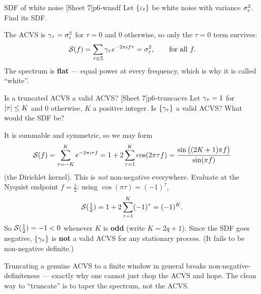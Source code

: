 \begin{exercise}{SDF of white noise \quad\textnormal{[Sheet 7]}}{p6-wnsdf}
Let $\{\varepsilon_t\}$ be white noise with variance $\sigma_\varepsilon^2$. Find its SDF.
\end{exercise}
\begin{solution}
The ACVS is $\gamma_\tau=\sigma_\varepsilon^2$ for $\tau=0$ and $0$ otherwise, so only
the $\tau=0$ term survives:
\[
\mathcal{S}(f)=\sum_{\tau\in\mathbb{Z}}\gamma_\tau e^{-2\pi i f\tau}=\sigma_\varepsilon^2,
\qquad\text{for all }f .
\]
The spectrum is \textbf{flat} --- equal power at every frequency, which is why
it is called ``white''.
\end{solution}

\begin{exercise}{Is a truncated ACVS a valid ACVS? \quad\textnormal{[Sheet 7]}}{p6-truncacvs}
Let $\gamma_\tau=1$ for $\left\lvert \tau \right\rvert\le K$ and $0$ otherwise, $K$ a positive
integer. Is $\{\gamma_\tau\}$ a valid ACVS? What would the SDF be?
\end{exercise}
\begin{solution}
It is summable and symmetric, so we may form
\[
\mathcal{S}(f)=\sum_{\tau=-K}^{K} e^{-2\pi i\tau f}
=1+2\sum_{\tau=1}^{K}\cos(2\pi\tau f)
=\frac{\sin\big((2K+1)\pi f\big)}{\sin(\pi f)}
\]
(the Dirichlet kernel). This is \emph{not} non-negative everywhere. Evaluate at
the Nyquist endpoint $f=\tfrac12$: using $\cos(\pi\tau)=(-1)^\tau$,
\[
\mathcal{S}(\tfrac12)=1+2\sum_{\tau=1}^{K}(-1)^\tau=(-1)^K .
\]
So $\mathcal{S}(\tfrac12)=-1<0$ whenever $K$ is \textbf{odd} (write $K=2q+1$). Since the
SDF goes negative, $\{\gamma_\tau\}$ is \textbf{not} a valid ACVS for any
stationary process. (It fails to be non-negative definite.)
\end{solution}

\begin{intuition}
Truncating a genuine ACVS to a finite window in general breaks
non-negative-definiteness --- exactly why one cannot just chop the ACVS and
hope. The clean way to ``truncate'' is to taper the spectrum, not the ACVS.
\end{intuition}

